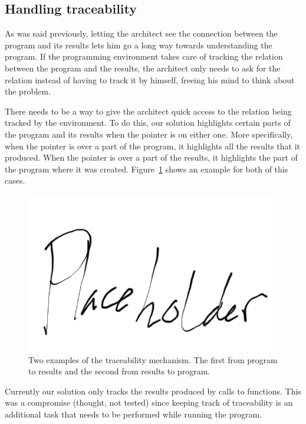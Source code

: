 \subsection{Handling traceability}
As was said previously, letting the architect see the connection between the program and its results lets him go a long way towards understanding the program.
If the programming environment takes care of tracking the relation between the program and the results, the architect only needs to ask for the relation instead of having to track it by himself, freeing his mind to think about the problem.

There needs to be a way to give the architect quick access to the relation being tracked by the environment.
To do this, our solution highlights certain parts of the program and  its results when the pointer is on either one.
More specifically, when the pointer is over a part of the program, it highlights all the results that it produced.
When the pointer is over a part of the results, it highlights the part of the program where it was created.
Figure~\ref{fig:trace:example} shows an example for both of this cases.

\begin{figure}
  \centering
  \includegraphics[width=12cm]{./images/traceability_example}
  \caption{Two examples of the traceability mechanism. The first from program to results and the second from results to program.}
  \label{fig:trace:example}
\end{figure}

Currently our solution only tracks the results produced by calls to functions.
This was a compromise (thought, not tested) since keeping track of traceability is an additional task that needs to be performed while running the program.

